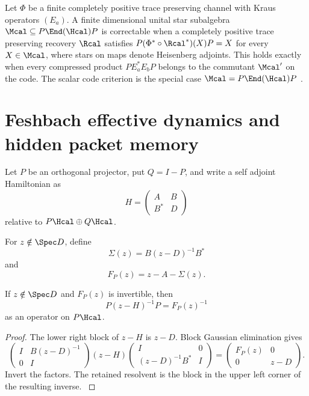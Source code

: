 \begin{standardfact}\label{strong:standardfact:003}\label{strong:fact:operator_qec}
Let \(\Phi\) be a finite completely positive trace preserving channel with Kraus operators \((E_a)\). A finite dimensional unital star subalgebra \(\Mcal\subseteq P\End(\Hcal)P\) is correctable when a completely positive trace preserving recovery \(\Rcal\) satisfies \(P(\Phi^*\circ\Rcal^*)(X)P=X\) for every \(X\in\Mcal\), where stars on maps denote Heisenberg adjoints. This holds exactly when every compressed product \(PE_a^*E_bP\) belongs to the commutant \(\Mcal'\) on the code. The scalar code criterion is the special case \(\Mcal=P\End(\Hcal)P\) \cite{BenyKempfKribs2007}.
\end{standardfact}

\section{Feshbach effective dynamics and hidden packet memory}\label{strong:section:009}\label{strong:sec:feshbach}

Let \(P\) be an orthogonal projector, put \(Q=I-P\), and write a self adjoint Hamiltonian as
\[
H=
\begin{pmatrix}
A&B\\
B^*&D
\end{pmatrix}
\]
relative to \(P\Hcal\oplus Q\Hcal\).

\begin{definition}\label{strong:definition:007}\label{strong:def:feshbach_map}
For \(z\notin\Spec D\), define
\[
\Sigma(z)=B(z-D)^{-1}B^*
\]
and
\[
F_P(z)=z-A-\Sigma(z).
\]
\end{definition}

\begin{theorem}\label{strong:theorem:029}\label{strong:thm:feshbach_resolvent}
If \(z\notin\Spec D\) and \(F_P(z)\) is invertible, then
\[
P(z-H)^{-1}P=F_P(z)^{-1}
\]
as an operator on \(P\Hcal\).
\end{theorem}

\begin{proof}\label{strong:proof:044}
The lower right block of \(z-H\) is \(z-D\). Block Gaussian elimination gives
\[
\begin{pmatrix}
I&B(z-D)^{-1}\\
0&I
\end{pmatrix}
(z-H)
\begin{pmatrix}
I&0\\
(z-D)^{-1}B^*&I
\end{pmatrix}
=
\begin{pmatrix}
F_P(z)&0\\
0&z-D
\end{pmatrix}.
\]
Invert the factors. The retained resolvent is the block in the upper left corner of the resulting inverse.
\label{strong:proof:044:end}\end{proof}


